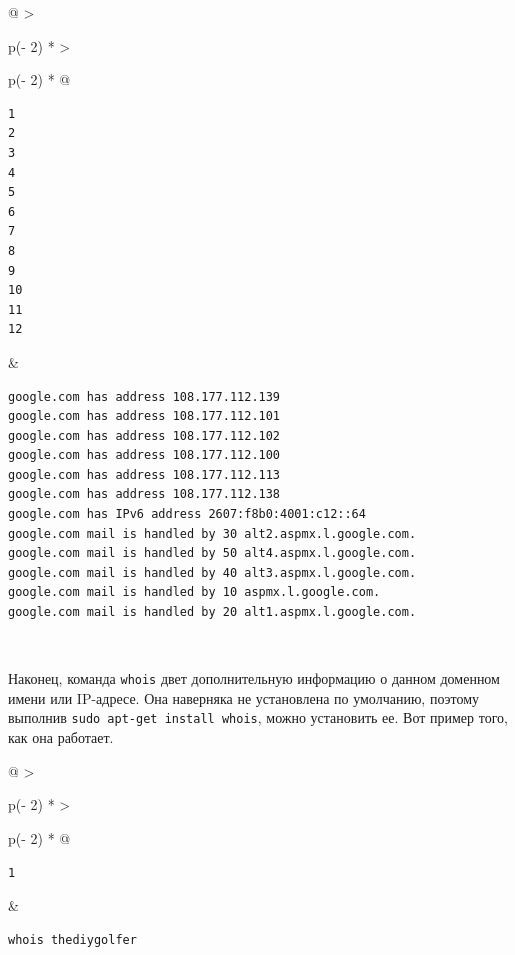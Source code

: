 \documentclass{article}
\begin{document}
\begin{longtable}[]{@{}
  >{\raggedright\arraybackslash}p{(\columnwidth - 2\tabcolsep) * }
  >{\raggedright\arraybackslash}p{(\columnwidth - 2\tabcolsep) * }@{}}
\toprule
\endhead
\begin{minipage}[t]{\linewidth}\raggedright
\begin{verbatim}
1
2
3
4
5
6
7
8
9
10
11
12
\end{verbatim}
\end{minipage} & \begin{minipage}[t]{\linewidth}\raggedright
\begin{verbatim}
google.com has address 108.177.112.139
google.com has address 108.177.112.101
google.com has address 108.177.112.102
google.com has address 108.177.112.100
google.com has address 108.177.112.113
google.com has address 108.177.112.138
google.com has IPv6 address 2607:f8b0:4001:c12::64
google.com mail is handled by 30 alt2.aspmx.l.google.com.
google.com mail is handled by 50 alt4.aspmx.l.google.com.
google.com mail is handled by 40 alt3.aspmx.l.google.com.
google.com mail is handled by 10 aspmx.l.google.com.
google.com mail is handled by 20 alt1.aspmx.l.google.com.
\end{verbatim}
\end{minipage} \\ \addlinespace
\bottomrule
\end{longtable}

Наконец, команда \texttt{whois} двет дополнительную информацию о данном
доменном имени или IP-адресе. Она наверняка не установлена по умолчанию,
поэтому выполнив \texttt{sudo\ apt-get\ install\ whois}, можно
установить ее. Вот пример того, как она работает.

\begin{longtable}[]{@{}
  >{\raggedright\arraybackslash}p{(\columnwidth - 2\tabcolsep) * }
  >{\raggedright\arraybackslash}p{(\columnwidth - 2\tabcolsep) * }@{}}
\toprule
\endhead
\begin{minipage}[t]{\linewidth}\raggedright
\begin{verbatim}
1
\end{verbatim}
\end{minipage} & \begin{minipage}[t]{\linewidth}\raggedright
\begin{verbatim}
whois thediygolfer
\end{verbatim}
\end{minipage} \\ \addlinespace
\bottomrule
\end{longtable}
\end{document}
